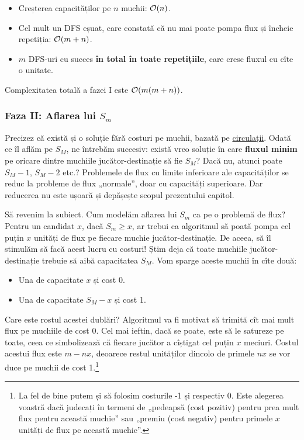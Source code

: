 \documentclass[../main.tex]{subfiles}
\begin{document}
\begin{itemize}
  \item Creșterea capacităților pe $n$ muchii: $\mathcal{O}(n)$.
  \item Cel mult un DFS eșuat, care constată că nu mai poate pompa flux și încheie repetiția: $\mathcal{O}(m + n)$.
  \item $m$ DFS-uri cu succes \textbf{în total în toate repetițiile}, care cresc fluxul cu cîte o unitate.
\end{itemize}

Complexitatea totală a fazei I este $\mathcal{O}(m(m + n))$.

\subsubsection*{Faza II: Aflarea lui \texorpdfstring{$S_m$}{S_m}}

Precizez că există și o soluție fără costuri pe muchii, bazată pe \href{https://en.wikipedia.org/wiki/Circulation_problem}{circulații}. Odată ce îl aflăm pe $S_M$, ne întrebăm succesiv: există vreo soluție în care \textbf{fluxul minim} pe oricare dintre muchiile jucător-destinație să fie $S_M$? Dacă nu, atunci poate $S_M - 1$, $S_M - 2$ etc.? Problemele de flux cu limite inferioare ale capacităților se reduc la probleme de flux „normale”, doar cu capacități superioare. Dar reducerea nu este ușoară și depășește scopul prezentului capitol.

Să revenim la subiect. Cum modelăm aflarea lui $S_m$ ca pe o problemă de flux? Pentru un candidat $x$, dacă $S_m \geq x$, ar trebui ca algoritmul să poată pompa cel puțin $x$ unități de flux pe fiecare muchie jucător-destinație. De aceea, să îl stimulăm să facă acest lucru cu costuri! Știm deja că toate muchiile jucător-destinație trebuie să aibă capacitatea $S_M$. Vom sparge aceste muchii în cîte două:

\begin{itemize}
  \item Una de capacitate $x$ și cost 0.
  \item Una de capacitate $S_M - x$ și cost 1.
\end{itemize}

Care este rostul acestei dublări? Algoritmul va fi motivat să trimită cît mai mult flux pe muchiile de cost 0. Cel mai ieftin, dacă se poate, este să le satureze pe toate, ceea ce simbolizează că fiecare jucător a cîștigat cel puțin $x$ meciuri. Costul acestui flux este $m - nx$, deoarece restul unităților dincolo de primele $nx$ se vor duce pe muchii de cost 1.\footnote{La fel de bine putem și să folosim costurile -1 și respectiv 0. Este alegerea voastră dacă judecați în termeni de „pedeapsă (cost pozitiv) pentru prea mult flux pentru această muchie” sau „premiu (cost negativ) pentru primele $x$ unități de flux pe această muchie”.}
\end{document}
